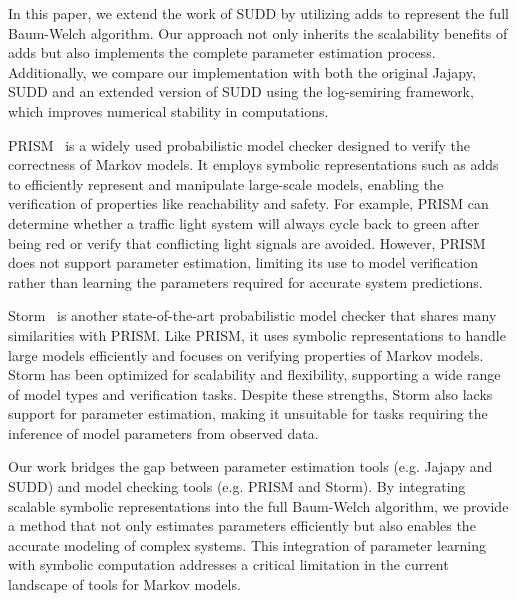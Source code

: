 In this paper, we extend the work of SUDD by utilizing \glspl{add} to represent the full Baum-Welch algorithm. Our approach not only inherits the scalability benefits of \glspl{add} but also implements the complete parameter estimation process. Additionally, we compare our implementation with both the original Jajapy, SUDD and an extended version of SUDD using the log-semiring framework, which improves numerical stability in computations.

PRISM~\cite{kwiatkowska2011prism} is a widely used probabilistic model checker designed to verify the correctness of Markov models. It employs symbolic representations such as \glspl{add} to efficiently represent and manipulate large-scale models, enabling the verification of properties like reachability and safety. For example, PRISM can determine whether a traffic light system will always cycle back to green after being red or verify that conflicting light signals are avoided. However, PRISM does not support parameter estimation, limiting its use to model verification rather than learning the parameters required for accurate system predictions.

Storm~\cite{hensel2021probabilistic} is another state-of-the-art probabilistic model checker that shares many similarities with PRISM. Like PRISM, it uses symbolic representations to handle large models efficiently and focuses on verifying properties of Markov models. Storm has been optimized for scalability and flexibility, supporting a wide range of model types and verification tasks. Despite these strengths, Storm also lacks support for parameter estimation, making it unsuitable for tasks requiring the inference of model parameters from observed data.

Our work bridges the gap between parameter estimation tools (e.g. Jajapy and SUDD) and model checking tools (e.g. PRISM and Storm). By integrating scalable symbolic representations into the full Baum-Welch algorithm, we provide a method that not only estimates parameters efficiently but also enables the accurate modeling of complex systems. This integration of parameter learning with symbolic computation addresses a critical limitation in the current landscape of tools for Markov models.






